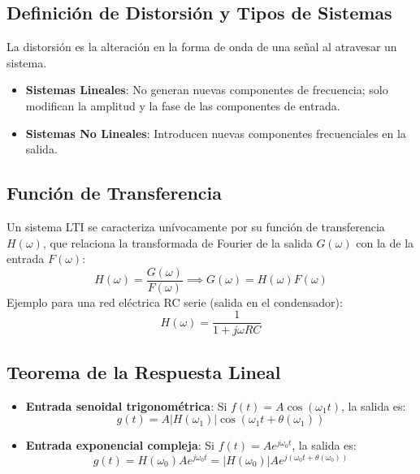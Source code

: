 \subsection{Definición de Distorsión y Tipos de Sistemas}
La distorsión es la alteración en la forma de onda de una señal al atravesar un sistema.
\begin{itemize}[leftmargin=*]
    \item \textbf{Sistemas Lineales}: No generan nuevas componentes de frecuencia; solo modifican la amplitud y la fase de las componentes de entrada.
    \item \textbf{Sistemas No Lineales}: Introducen nuevas componentes frecuenciales en la salida.
\end{itemize}

\subsection{Función de Transferencia}
Un sistema LTI se caracteriza unívocamente por su función de transferencia $H(\omega)$, que relaciona la transformada de Fourier de la salida $G(\omega)$ con la de la entrada $F(\omega)$:
\begin{equation}
    H(\omega) = \frac{G(\omega)}{F(\omega)} \implies G(\omega) = H(\omega) F(\omega)
\end{equation}
Ejemplo para una red eléctrica RC serie (salida en el condensador):
\begin{equation}
    H(\omega) = \frac{1}{1 + j\omega RC}
\end{equation}

\subsection{Teorema de la Respuesta Lineal}
\begin{itemize}[leftmargin=*]
    \item \textbf{Entrada senoidal trigonométrica}: Si $f(t) = A \cos(\omega_1 t)$, la salida es:
    \begin{equation}
        g(t) = A |H(\omega_1)| \cos(\omega_1 t + \theta(\omega_1))
    \end{equation}
    \item \textbf{Entrada exponencial compleja}: Si $f(t) = A e^{j \omega_0 t}$, la salida es:
    \begin{equation}
        g(t) = H(\omega_0) A e^{j \omega_0 t} = |H(\omega_0)| A e^{j(\omega_0 t + \theta(\omega_0))}
    \end{equation}
\end{itemize}

